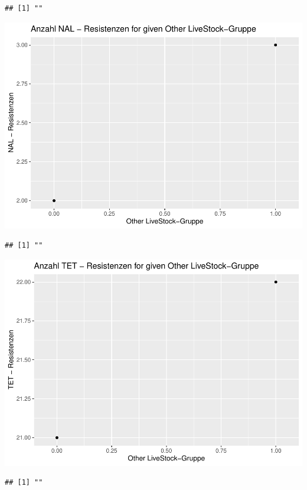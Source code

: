 \documentclass[
]{article}
\begin{document}
\begin{verbatim}
## [1] ""
\end{verbatim}

\includegraphics{NResistenzen_files/figure-latex/binary_or_nominal_variables-17.pdf}

\begin{verbatim}
## [1] ""
\end{verbatim}

\includegraphics{NResistenzen_files/figure-latex/binary_or_nominal_variables-18.pdf}

\begin{verbatim}
## [1] ""
\end{verbatim}
\end{document}
